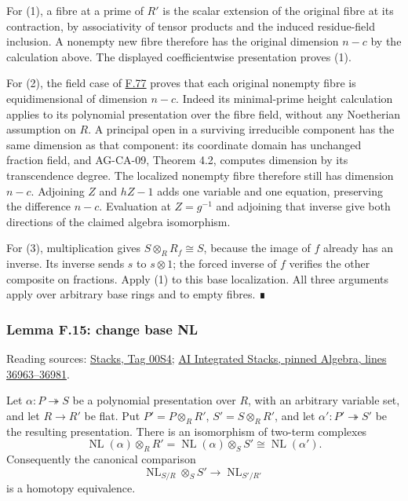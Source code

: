 \documentclass[11pt,a4paper,openany]{report}
\newcounter{none}
\begin{document}
For (1), a fibre at a prime of \(R'\) is the scalar extension of the original fibre at its contraction, by associativity of tensor products and the induced residue-field inclusion. A nonempty new fibre therefore has the original dimension \(n-c\) by the calculation above. The displayed coefficientwise presentation proves (1).

For (2), the field case of \hyperref[AG-RG-S05-algebra-lemma-relative-global-complete-intersection-conormal]{F.77} proves that each original nonempty fibre is equidimensional of dimension \(n-c\). Indeed its minimal-prime height calculation applies to its polynomial presentation over the fibre field, without any Noetherian assumption on \(R\). A principal open in a surviving irreducible component has the same dimension as that component: its coordinate domain has unchanged fraction field, and AG-CA-09, Theorem 4.2, computes dimension by its transcendence degree. The localized nonempty fibre therefore still has dimension \(n-c\). Adjoining \(Z\) and \(hZ-1\) adds one variable and one equation, preserving the difference \(n-c\). Evaluation at \(Z=g^{-1}\) and adjoining that inverse give both directions of the claimed algebra isomorphism.

For (3), multiplication gives \(S\otimes_RR_f\cong S\), because the image of \(f\) already has an inverse. Its inverse sends \(s\) to \(s\otimes1\); the forced inverse of \(f\) verifies the other composite on fractions. Apply (1) to this base localization. All three arguments apply over arbitrary base rings and to empty fibres. ∎

\label{AG-RG-S05-algebra-lemma-change-base-NL}

\subsubsection{Lemma F.15: change base NL}\label{AG-RG-S05-lemma-f.15-change-base-nl}

Reading sources: \href{https://stacks.math.columbia.edu/tag/00S4}{Stacks, Tag 00S4}; \href{https://github.com/KokunoYumeto/unofficial-stacks-project-ai-drafts/blob/565b10e987aba5969b21145a0833f42d69f96790/algebra.tex\#L36963-L36981}{AI Integrated Stacks, pinned Algebra, lines 36963--36981}.

Let \(\alpha:P\twoheadrightarrow S\) be a polynomial presentation over \(R\), with an arbitrary variable set, and let \(R\to R'\) be flat. Put \(P'=P\otimes_RR'\), \(S'=S\otimes_RR'\), and let \(\alpha':P'\twoheadrightarrow S'\) be the resulting presentation. There is an isomorphism of two-term complexes \[\operatorname{NL}(\alpha)\otimes_RR'
=\operatorname{NL}(\alpha)\otimes_SS'
\cong\operatorname{NL}(\alpha').\] Consequently the canonical comparison \[\operatorname{NL}_{S/R}\otimes_SS'\longrightarrow
\operatorname{NL}_{S'/R'}\] is a homotopy equivalence.
\end{document}
